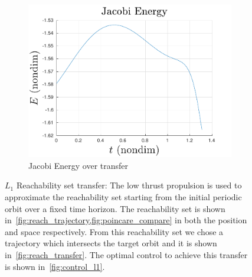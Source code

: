 \begin{figure}
        \begin{subfigure}[htbp]{0.5\textwidth} 
            \includegraphics[width=\textwidth, keepaspectratio]{figures/2017_JAS/jacobi.pdf} 
            \caption{Jacobi Energy over transfer \label{fig:jacobi_l1}} 
        \end{subfigure} 

        \caption{\( L_1 \) Reachability set transfer: The low thrust propulsion is used to approximate the reachability set starting from the initial periodic orbit over a fixed time horizon.
            The reachability set is shown in~\cref{fig:reach_trajectory,fig:poincare_compare} in both the position and \Poincare space respectively.
            From this reachability set we chose a trajectory which intersects the target orbit and it is shown in~\cref{fig:reach_transfer}.
        The optimal control to achieve this transfer is shown in~\cref{fig:control_l1}.}
        \label{fig:reachability_set_transfer} 
\end{figure}

